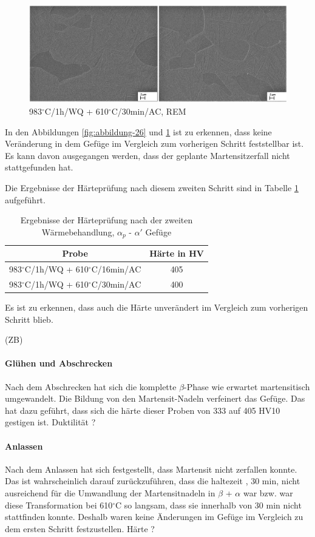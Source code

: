 \begin{figure}
	\centering
	\includegraphics[width=1.0\linewidth]{./Bilder/Abbildung 27.png}
	\caption[Abbildung 27]{983$^\circ$C/1h/WQ + 610$^\circ$C/30min/AC, REM}
	\label{fig:abbildung-27}
\end{figure}

In den Abbildungen \ref{fig:abbildung-26} und \ref{fig:abbildung-27} ist zu erkennen, dass keine Veränderung in dem Gefüge im Vergleich zum vorherigen Schritt feststellbar ist. Es kann davon ausgegangen werden, dass der geplante Martensitzerfall nicht stattgefunden hat.

Die Ergebnisse der Härteprüfung nach diesem zweiten Schritt sind in Tabelle \ref{Tabelle 9} aufgeführt.

\begin{table}
	\centering
	\begin{tabular}{|c|c|}
		\hline 
		Probe & Härte in HV \\ 
		\hline 
		983$^\circ$C/1h/WQ + 610$^\circ$C/16min/AC & 405 \\ 
		\hline 
		983$^\circ$C/1h/WQ + 610$^\circ$C/30min/AC & 400 \\ 
		\hline 
	\end{tabular} 
	\caption{Ergebnisse der Härteprüfung nach der zweiten Wärmebehandlung, $\alpha_p$ - $\alpha'$ Gefüge}
	\label{Tabelle 9}
\end{table}

Es ist zu erkennen, dass auch die Härte unverändert im Vergleich zum vorherigen Schritt blieb.

(ZB)

\paragraph{Glühen und Abschrecken}
Nach dem Abschrecken hat sich die komplette $\beta$-Phase wie erwartet martensitisch umgewandelt. Die Bildung von den Martensit-Nadeln verfeinert das Gefüge. Das hat dazu geführt, dass sich die härte dieser Proben von 333 auf 405 HV10 gestigen ist. Duktilität ?
\paragraph{Anlassen} Nach dem Anlassen hat sich festgestellt, dass Martensit nicht zerfallen konnte. Das ist wahrscheinlich darauf zurückzuführen, dass die haltezeit , 30 min, nicht ausreichend für die Umwandlung der Martensitnadeln in  $\beta$ + $\alpha$ war bzw. war diese Transformation bei 610$^\circ$C so langsam, dass sie innerhalb von 30 min nicht stattfinden konnte.
Deshalb waren keine Änderungen im Gefüge im Vergleich zu dem ersten Schritt  festzustellen. Härte ?

